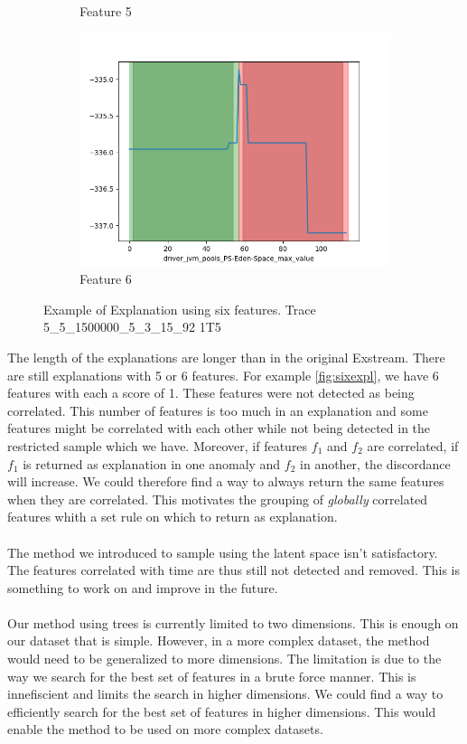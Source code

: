 \documentclass[oneside, a4paper, onecolumn, 11pt]{article}
\begin{document}
\begin{figure}[H]
\begin{subfigure}{0.30\textwidth}
  \caption{Feature 5}
\end{subfigure}
\begin{subfigure}{0.30\textwidth}
  \centering
  \includegraphics[width=\linewidth]{images/ex6.png}
  \caption{Feature 6}
\end{subfigure}
  \caption{Example of Explanation using six features. Trace 5\_5\_1500000\_5\_3\_15\_92 1T5}
  \label{fig:sixexpl}
\end{figure}
The length of the explanations are longer than in the original Exstream. There are still explanations with 5 or 6 features. For example \autoref{fig:sixexpl}, we have 6 features with each a score of 1. These features were not detected as being correlated. This number of features is too much in an explanation and some features might be correlated with each other while not being detected in the restricted sample which we have. Moreover, if features $f_1$ and $f_2$ are correlated, if $f_1$ is returned as explanation in one anomaly and $f_2$ in another, the discordance will increase. We could therefore find a way to always return the same features when they are correlated. This motivates the grouping of \textit{globally} correlated features whith a set rule on which to return as explanation.\\\\
The method we introduced to sample using the latent space isn't satisfactory. The features correlated with time are thus still not detected and removed. This is something to work on and improve in the future.\\\\
Our method using trees is currently limited to two dimensions. This is enough on our dataset that is simple. However, in a more complex dataset, the method would need to be generalized to more dimensions. The limitation is due to the way we search for the best set of features in a brute force manner. This is innefiscient and limits the search in higher dimensions. We could find a way to efficiently search for the best set of features in higher dimensions. This would enable the method to be used on more complex datasets.\\\\
\end{document}

